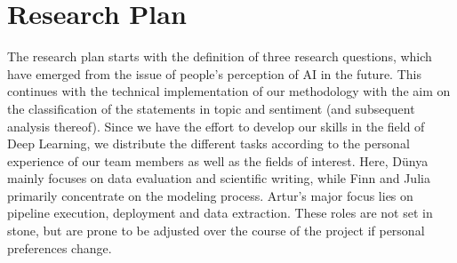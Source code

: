 \documentclass[11pt]{article}
\begin{document}
\section{Research Plan}
The research plan starts with the definition of three research questions, which have emerged from the issue of people’s perception of AI in the future.
This continues with the technical implementation of our methodology with the aim on the classification of the statements in topic and sentiment (and subsequent analysis thereof).
Since we have the effort to develop our skills in the field of Deep Learning, we distribute the different tasks according to the personal experience of our team members as well as the fields of interest.
Here, Dünya mainly focuses on data evaluation and scientific writing, while Finn and Julia primarily concentrate on the modeling process.
Artur's major focus lies on pipeline execution, deployment and data extraction.
These roles are not set in stone, but are prone to be adjusted over the course of the project if personal preferences change.

\nocite{*}


\end{document}
